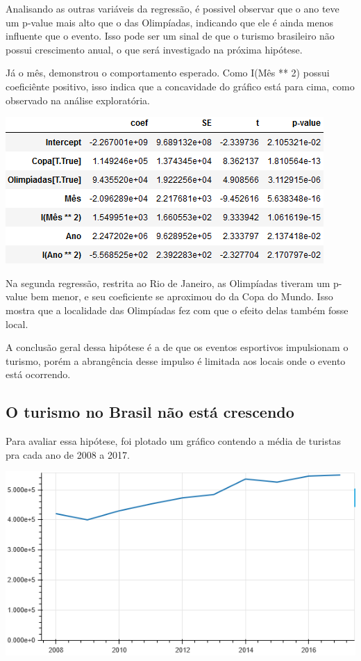 \documentclass[review]{elsarticle}
\begin{document}
Analisando as outras variáveis da regressão, é possivel observar que o ano teve um p-value mais alto que o das Olimpíadas, indicando que ele é ainda menos influente que o evento. Isso pode ser um sinal de que o turismo brasileiro não possui crescimento anual, o que será investigado na próxima hipótese.

Já o mês, demonstrou o comportamento esperado. Como I(Mês ** 2) possui coeficiênte positivo, isso indica que a concavidade do gráfico está para cima, como observado na análise exploratória.

\includegraphics[width=\textwidth]{Regression-RJ}

Na segunda regressão, restrita ao Rio de Janeiro, as Olimpíadas tiveram um p-value bem menor, e seu coeficiente se aproximou do da Copa do Mundo. Isso mostra que a localidade das Olimpíadas fez com que o efeito delas também fosse local.

A conclusão geral dessa hipótese é a de que os eventos esportivos impulsionam o turismo, porém a abrangência desse impulso é limitada aos locais onde o evento está ocorrendo.

\subsection{O turismo no Brasil não está crescendo}
Para avaliar essa hipótese, foi plotado um gráfico contendo a média de turistas pra cada ano de 2008 a 2017.

\includegraphics[width=\textwidth]{Segment-Tourist-Year}
\end{document}
